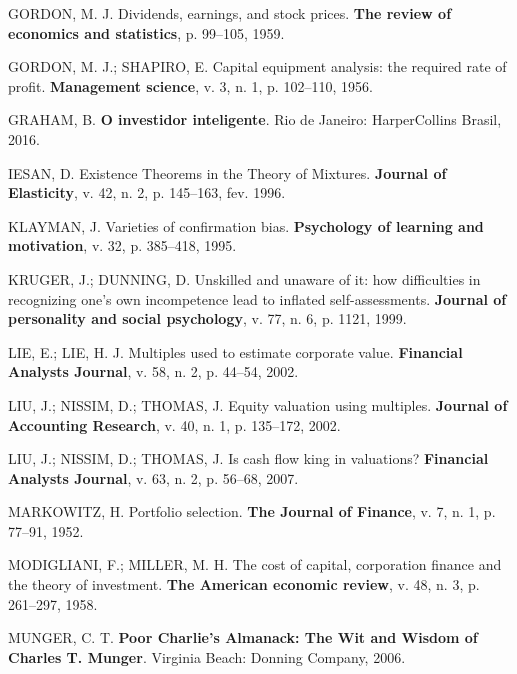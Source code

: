 \documentclass[grad,numbers]{coppe}
\newenvironment{cslreferences}%
  {}%
  {\par}
\begin{document}
\begin{cslreferences}
  \leavevmode\hypertarget{ref-gordon1959}{}%
  GORDON, M. J. Dividends, earnings, and stock prices. \textbf{The review of economics and statistics}, p. 99--105, 1959.

  \leavevmode\hypertarget{ref-gordon1956}{}%
  GORDON, M. J.; SHAPIRO, E. Capital equipment analysis: the required rate of profit. \textbf{Management science}, v. 3, n. 1, p. 102--110, 1956.

  \leavevmode\hypertarget{ref-graham2016}{}%
  GRAHAM, B. \textbf{O investidor inteligente}. Rio de Janeiro: HarperCollins Brasil, 2016.

  \leavevmode\hypertarget{ref-article-example}{}%
  IESAN, D. Existence Theorems in the Theory of Mixtures. \textbf{Journal of Elasticity}, v. 42, n. 2, p. 145--163, fev. 1996.

  \leavevmode\hypertarget{ref-klayman1995}{}%
  KLAYMAN, J. Varieties of confirmation bias. \textbf{Psychology of learning and motivation}, v. 32, p. 385--418, 1995.

  \leavevmode\hypertarget{ref-kruger1999}{}%
  KRUGER, J.; DUNNING, D. Unskilled and unaware of it: how difficulties in recognizing one's own incompetence lead to inflated self-assessments. \textbf{Journal of personality and social psychology}, v. 77, n. 6, p. 1121, 1999.

  \leavevmode\hypertarget{ref-lie2002}{}%
  LIE, E.; LIE, H. J. Multiples used to estimate corporate value. \textbf{Financial Analysts Journal}, v. 58, n. 2, p. 44--54, 2002.

  \leavevmode\hypertarget{ref-liu2002}{}%
  LIU, J.; NISSIM, D.; THOMAS, J. Equity valuation using multiples. \textbf{Journal of Accounting Research}, v. 40, n. 1, p. 135--172, 2002.

  \leavevmode\hypertarget{ref-liu2007}{}%
  LIU, J.; NISSIM, D.; THOMAS, J. Is cash flow king in valuations? \textbf{Financial Analysts Journal}, v. 63, n. 2, p. 56--68, 2007.

  \leavevmode\hypertarget{ref-markowitz1952}{}%
  MARKOWITZ, H. Portfolio selection. \textbf{The Journal of Finance}, v. 7, n. 1, p. 77--91, 1952.

  \leavevmode\hypertarget{ref-modigliani1958}{}%
  MODIGLIANI, F.; MILLER, M. H. The cost of capital, corporation finance and the theory of investment. \textbf{The American economic review}, v. 48, n. 3, p. 261--297, 1958.

  \leavevmode\hypertarget{ref-munger2006}{}%
  MUNGER, C. T. \textbf{Poor Charlie's Almanack: The Wit and Wisdom of Charles T. Munger}. Virginia Beach: Donning Company, 2006.


\end{cslreferences}
\end{document}
